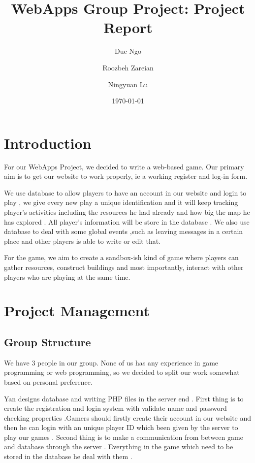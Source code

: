 \documentclass[a4wide, 11pt]{article}
\begin{document}
\title{WebApps Group Project: Project Report}

\author{Duc Ngo \and Roozbeh Zareian \and Ningyuan Lu}

\date{\today}         %

\maketitle            %

\section{Introduction}

For our WebApps Project, we decided to write a web-based game. Our primary aim is to get our website to work properly, ie a working register and log-in form. 

We use database to allow players to have an account in our website and login to play , we give every new play a unique identification and it will keep tracking player’s activities including the resources he had already and how big the map he has explored . All player’s information will be store in the database . We also use database to deal with some global events ,such as leaving messages in a certain place and other players is able to write or edit that.

For the game, we aim to create a sandbox-ish kind of game where players can gather resources, construct buildings and most importantly, interact with other players who are playing at the same time.

\section{Project Management}
\subsection{Group Structure}

We have 3 people in our group. None of us has any experience in game programming or web programming, so we decided to split our work somewhat based on personal preference. 

Yan designs database and writing PHP files in the server end . 
First thing is to create the registration and login system with validate name and password checking properties .Gamers should firstly create their account in our website and then he can login with an unique player ID which been given by the server to play our games .
Second thing is to make a communication from between game and database through the server . Everything in the game which need to be stored in the database he deal with them .
\end{document}
